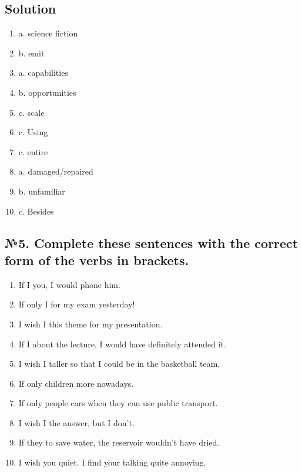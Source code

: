 \subsection*{Solution}
\begin{enumerate}
      \item a. science fiction
      \item b. emit
      \item a. capabilities
      \item b. opportunities
      \item c. scale
      \item c. Using
      \item c. entire
      \item a. damaged/repaired
      \item b. unfamiliar
      \item c. Besides
\end{enumerate}

\subsection*{№5. Complete these sentences with the correct form of the verbs in brackets.}
\begin{enumerate}
      \item If I \underline{\hspace{2cm}} you, I would phone him.
      \item If only I \underline{\hspace{2cm}} for my exam yesterday!
      \item I wish I \underline{\hspace{2cm}} this theme for my presentation.
      \item If I \underline{\hspace{2cm}} about the lecture, I would have definitely attended it.
      \item I wish I \underline{\hspace{2cm}} taller so that I could be in the basketball team.
      \item If only children \underline{\hspace{2cm}} more nowadays.
      \item If only people \underline{\hspace{2cm}} cars when they can use public transport.
      \item I wish I \underline{\hspace{2cm}} the answer, but I don’t.
      \item If they \underline{\hspace{2cm}} to save water, the reservoir wouldn’t have dried.
      \item I wish you \underline{\hspace{2cm}} quiet. I find your talking quite annoying.
\end{enumerate}


